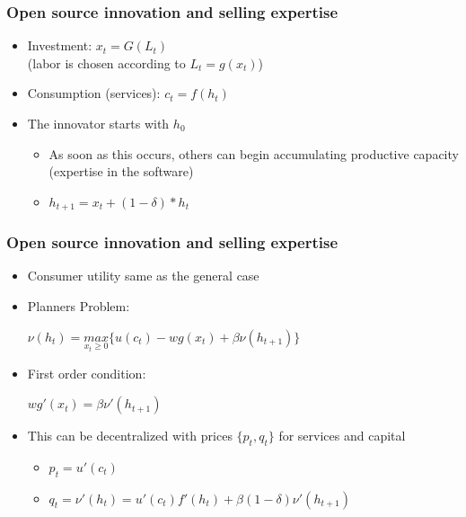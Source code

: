 \documentclass{beamer}
\begin{document}

\begin{frame}[t]
  \frametitle{Open source innovation and selling expertise}
  \begin{itemize}
    \item<+-> Investment: $x_t = G(L_t)$\\ (labor is chosen according to $L_t = g(x_t)$)
    \item<+-> Consumption (services): $c_t = f(h_t)$
    \item<+-> The innovator starts with $h_0$
    \begin{itemize}
      \item<+-> As soon as this occurs, others can begin accumulating productive capacity (expertise in the software)
      \item<+-> $h_{t+1} = x_t + (1-\delta)*h_t$
    \end{itemize}
  \end{itemize}
\end{frame}

\begin{frame}[t]\frametitle{Open source innovation and selling expertise}
  \begin{itemize}
    \item<+-> Consumer utility same as the general case
    \item<+-> Planners Problem:\\ 
    \begin{centering}
      $\nu(h_t) = \underset{x_t \ge 0}{max} \{u(c_t) - wg(x_t) + \beta\nu(h_{t+1})\}$
    \end{centering}
    \item<+-> First order condition:\\
    \begin{centering}
      $wg'(x_t) = \beta\nu'(h_{t+1})$
    \end{centering}
    \item<+-> This can be decentralized with prices $\{p_t, q_t\}$ for services and capital
    \begin{itemize}
    \item<+-> $p_t = u'(c_t)$
    \item<+-> $q_t = \nu'(h_t) = u'(c_t)f'(h_t) + \beta(1-\delta)\nu'(h_{t+1})$ 
    \end{itemize} 
  \end{itemize}
\end{frame}
\end{document}
